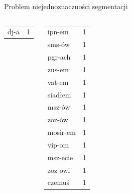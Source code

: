 \documentclass[xcolor=dvipsnames,polish]{beamer}
\begin{document}
\begin{frame}{Problem niejednoznaczności segmentacji}
\begin{columns}[c]
\begin{center}
\begin{tabular}{l|r}
        dj-a & 1 \\
      \end{tabular}
    \end{center}
    \begin{center}
      \footnotesize
      \begin{tabular}{l|r}
        ipn-em & 1 \\
        sms-ów & 1 \\
        pgr-ach & 1 \\
        zus-em & 1 \\
        vat-em & 1 \\
        siadłem & 1 \\
        msz-ów & 1 \\
        zoz-ów & 1 \\
        mosir-em & 1 \\
        vip-om & 1 \\
        msz-ecie & 1 \\
        zoz-owi & 1 \\
        czemuś & 1 \\
      \end{tabular}
    \end{center}
  \end{columns}
\end{frame}
\end{document}
